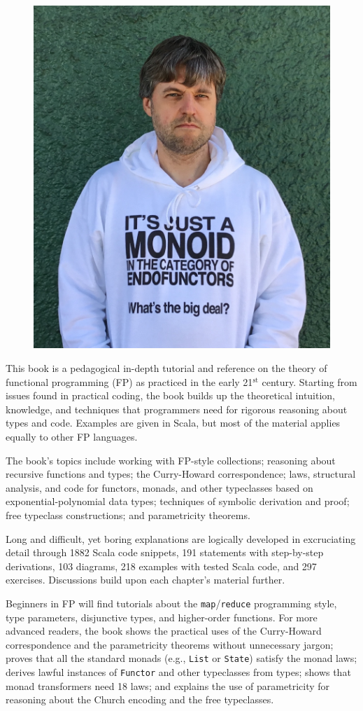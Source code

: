 \onecolumn
\thispagestyle{empty}
 
\begin{figure}
\includegraphics[width=0.4\columnwidth]{monads_evil_face}
\vspace{-2.0\baselineskip}
\end{figure}

\smaller
This book is a pedagogical in-depth tutorial and reference
on the theory of functional programming (FP) as practiced in the early
21$^{\text{st}}$ century. Starting from issues found in practical
coding, the book builds up the theoretical intuition, knowledge, and
techniques that programmers need for rigorous reasoning about types
and code. Examples are given in Scala, but most of the material applies equally
to other FP languages.

The book's topics include working with FP-style collections; reasoning about recursive
functions and types; the Curry-Howard correspondence; laws, structural
analysis, and code for functors, monads, and other typeclasses based on exponential-polynomial data types; 
techniques of symbolic derivation and proof;
free typeclass constructions; and
parametricity theorems.

Long and difficult, yet boring explanations are logically
developed in excruciating detail through 1882
Scala code snippets, 191 statements with step-by-step
derivations, 103 diagrams, 218 examples
with tested Scala code, and 297 exercises. Discussions
build upon each chapter's material further.

Beginners in FP will find tutorials about the \texttt{map}/\texttt{reduce}
programming style, type parameters, disjunctive types, and higher-order
functions. For more advanced readers, the book shows  the practical
uses of the Curry-Howard correspondence and the parametricity theorems
without unnecessary jargon; proves that all the standard monads (e.g.,
\texttt{List} or \texttt{State})
satisfy the monad laws; derives lawful instances of \texttt{Functor}
and other typeclasses from types; shows that monad transformers need
18 laws;
and explains the use of parametricity for reasoning about the Church encoding and the free typeclasses.

